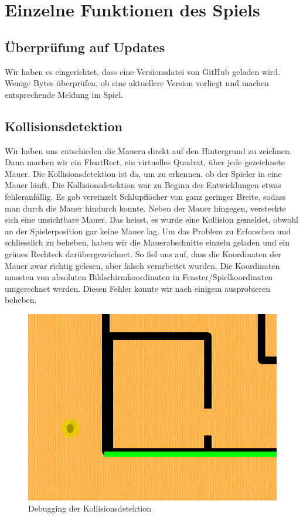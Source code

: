 \documentclass[11pt,a4paper]{scrbook}
\begin{document}
\newpage
\section{Einzelne Funktionen des Spiels}

\subsection{Überprüfung auf Updates}
Wir haben es eingerichtet, dass eine Versionsdatei von GitHub geladen wird. Wenige Bytes überprüfen, ob eine aktuellere Version vorliegt und machen entsprechende Meldung im Spiel.

\subsection{Kollisionsdetektion}
Wir haben uns entschieden die Mauern direkt auf den Hintergrund zu zeichnen. Dann machen wir ein FloatRect, ein virtuelles Quadrat,
über jede gezeichnete Mauer. Die Kollisionsdetektion ist da, um zu erkennen, ob der Spieler in eine Mauer läuft.
Die Kollisionsdetektion war zu Beginn der Entwicklungen etwas fehleranfällig. Es gab vereinzelt
Schlupflöcher von ganz geringer Breite, sodass man durch die Mauer hindurch konnte. Neben der Mauer hingegen,
versteckte sich eine unsichtbare Mauer. Das heisst, es wurde eine Kollision gemeldet, obwohl an der
Spielerposition gar keine Mauer lag. Um das Problem zu Erforschen und schliesslich zu beheben, haben
wir die Mauerabschnitte einzeln geladen und ein grünes Rechteck darübergezeichnet. So fiel uns auf, dass
die Koordinaten der Mauer zwar richtig gelesen, aber falsch verarbeitet wurden. Die Koordinaten mussten
von absoluten Bildschirmkoordinaten in Fenster/Spielkoordinaten umgerechnet werden. Diesen Fehler konnte wir nach einigem ausprobieren beheben.

\begin{figure}[h]
\centering
\includegraphics[scale=0.3]{img/kollisionsdetektion.png}
\caption{Debugging der Kollisionsdetektion}
\end{figure}
\end{document}
